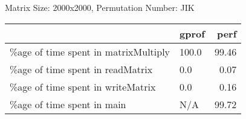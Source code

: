 \documentclass{article}
\begin{document}
    Matrix Size: 2000x2000, Permutation Number: JIK \\
    \begin{tabular}{llr}
\hline
                                      & gprof   &   perf \\
\hline
 \%age of time spent in matrixMultiply & 100.0   &  99.46 \\
 \%age of time spent in readMatrix     & 0.0     &   0.07 \\
 \%age of time spent in writeMatrix    & 0.0     &   0.16 \\
 \%age of time spent in main           & N/A     &  99.72 \\
\hline
\end{tabular}
    
\end{document}
